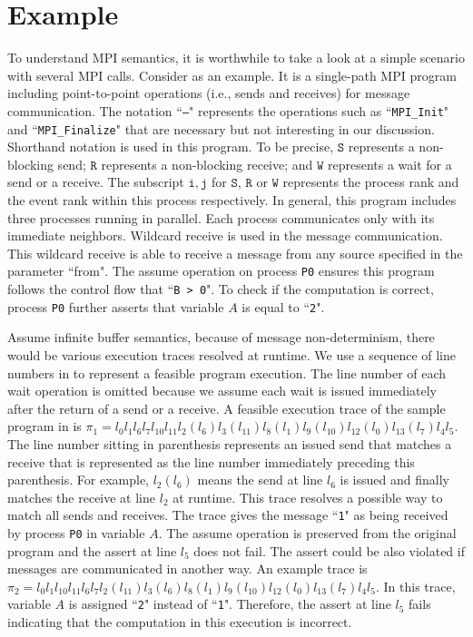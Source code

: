 \section{Example}\label{sec:example}
To understand MPI semantics, it is worthwhile to take a look at a simple scenario with several MPI calls. Consider  as an example. It is a single-path MPI program including point-to-point operations (i.e., sends and receives) for message communication. The notation ``\texttt{---}" represents the operations such as ``\texttt{MPI\_Init}" and ``\texttt{MPI\_Finalize}" that are necessary but not interesting in our discussion. Shorthand notation is used in this program. To be precise, $\mathtt{S}$ represents a non-blocking send; $\mathtt{R}$ represents a non-blocking receive; and $\mathtt{W}$ represents a wait for a send or a receive. The subscript $\mathtt{i,j}$ for $\mathtt{S}$, $\mathtt{R}$ or $\mathtt{W}$ represents the process rank and the event rank within this process respectively.
In general, this program includes three processes running in parallel. Each process communicates only with its immediate neighbors. Wildcard receive is used in the message communication. This wildcard receive is able to receive a message from any source specified in the parameter ``from". The assume operation on process \texttt{P0} ensures this program follows the control flow that ``\texttt{B > 0}". To check if the computation is correct, process \texttt{P0} further asserts that variable $A$ is equal to ``\texttt{2}".  

Assume infinite buffer semantics, because of message non-determinism, there would be various execution traces resolved at runtime. We use a sequence of line numbers in  to represent a feasible program execution. The line number of each wait operation is omitted because we assume each wait is issued immediately after the return of a send or a receive. A feasible execution trace of the sample program in  is $\pi_1 = l_0l_1l_6l_7l_{10}l_{11}l_2(l_6)l_3(l_{11})l_8(l_1)l_9(l_{10})l_{12}(l_0)l_{13}(l_7)l_4l_5$. The line number sitting in parenthesis represents an issued send that matches a receive that is represented as the line number immediately preceding this parenthesis. For example, $l_2(l_6)$ means the send at line $l_6$ is issued and finally matches the receive at line $l_2$ at runtime. This trace resolves a possible way to match all sends and receives. The trace gives the message ``\texttt{1}" as being received by process \texttt{P0} in variable $A$. The assume operation is preserved from the original program and the assert at line $l_5$ does not fail. The assert could be also violated if messages are communicated in another way. An example trace is $\pi_2 = l_0l_1l_{10}l_{11}l_6l_7l_2(l_{11})l_3(l_6)l_8(l_1)l_9(l_{10})l_{12}(l_0)l_{13}(l_7)l_4l_5$. In this trace, variable $A$ is assigned ``\texttt{2}" instead of ``\texttt{1}". Therefore, the assert at line $l_5$ fails indicating that the computation in this execution is incorrect. 


